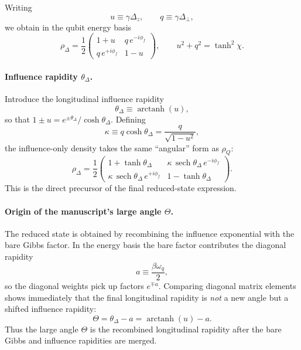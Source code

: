 Writing
\begin{equation}
    u \equiv \gamma \Delta_z,
    \qquad
    q \equiv \gamma \Delta_\perp,
\end{equation}
we obtain in the qubit energy basis
\begin{equation}
    \rho_{\Delta}
    = \frac{1}{2}
    \begin{pmatrix}
        1+u & q\,e^{-i\phi_f}\\
        q\,e^{+i\phi_f} & 1-u
    \end{pmatrix},
    \qquad
    u^2+q^2 = \tanh^2\chi.
    \label{eq:branch_codex_rhoDelta_matrix}
\end{equation}

\paragraph{Influence rapidity $\theta_\Delta$.}
Introduce the longitudinal influence rapidity
\begin{equation}
    \theta_\Delta \equiv \operatorname{arctanh}(u),
    \label{eq:branch_codex_thetaDelta}
\end{equation}
so that $1\pm u = e^{\pm\theta_\Delta}/\cosh\theta_\Delta$.  Defining
\begin{equation}
    \kappa \equiv q \cosh\theta_\Delta
    = \frac{q}{\sqrt{1-u^2}},
    \label{eq:branch_codex_kappa_from_q}
\end{equation}
the influence-only density takes the same ``angular'' form as $\rho_Q$:
\begin{equation}
    \rho_{\Delta}
    = \frac{1}{2}
    \begin{pmatrix}
        1+\tanh\theta_\Delta &
        \kappa\,\operatorname{sech}\theta_\Delta\,e^{-i\phi_f}\\
        \kappa\,\operatorname{sech}\theta_\Delta\,e^{+i\phi_f} &
        1-\tanh\theta_\Delta
    \end{pmatrix}.
    \label{eq:branch_codex_rhoDelta_angular}
\end{equation}
This is the direct precursor of the final reduced-state expression.

\paragraph{Origin of the manuscript's large angle $\Theta$.}
The reduced state is obtained by recombining the influence exponential with the
bare Gibbs factor.  In the energy basis the bare factor contributes the
diagonal rapidity
\begin{equation}
    a \equiv \frac{\beta\omega_q}{2},
\end{equation}
so the diagonal weights pick up factors $e^{\mp a}$.  Comparing diagonal matrix
elements shows immediately that the final longitudinal rapidity is \emph{not} a
new angle but a shifted influence rapidity:
\begin{equation}
    \Theta = \theta_\Delta - a
    = \operatorname{arctanh}(u)-a.
    \label{eq:branch_codex_bigTheta_origin}
\end{equation}
Thus the large angle $\Theta$ is the recombined longitudinal rapidity after the
bare Gibbs and influence rapidities are merged.

